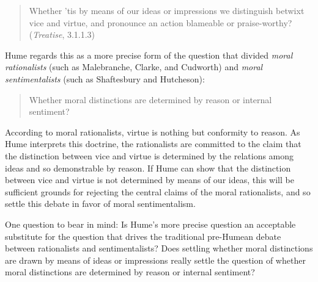 \begin{quote}
    Whether 'tis by means of our ideas or impressions we distinguish betwixt vice and virtue, and pronounce an action blameable or praise-worthy? (\emph{Treatise}, 3.1.1.3)
\end{quote}

Hume regards this as a more precise form of the question that divided \emph{moral rationalists} (such as Malebranche, Clarke, and Cudworth) and \emph{moral sentimentalists} (such as Shaftesbury and Hutcheson):

\begin{quote}
    Whether moral distinctions are determined by reason or internal sentiment?
\end{quote}

According to moral rationalists, virtue is nothing but conformity to reason. As Hume interprets this doctrine, the rationalists are committed to the claim that the distinction between vice and virtue is determined by the relations among ideas and so demonstrable by reason. If Hume can show that the distinction between vice and virtue is not determined by means of our ideas, this will be sufficient grounds for rejecting the central claims of the moral rationalists, and so settle this debate in favor of moral sentimentalism.

One question to bear in mind: Is Hume's more precise question an acceptable substitute for the question that drives the traditional pre-Humean debate between rationalists and sentimentalists? Does settling whether moral distinctions are drawn by means of ideas or impressions really settle the question of whether moral distinctions are determined by reason or internal sentiment? \change

% 


